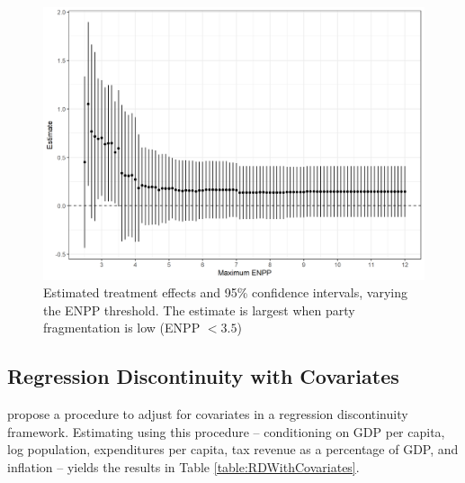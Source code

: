 \documentclass[12pt]{article}
\begin{document}
\begin{appendices}
	\begin{figure}[h]
		\centering
		\includegraphics[width=\linewidth]{figures/Figure8.png}
		\caption{Estimated treatment effects and 95\% confidence intervals, varying the ENPP threshold. The estimate is largest when party fragmentation is low (ENPP $< 3.5$)}
		\label{fig:rdEstimateVaryingENPP}
	\end{figure}

	\subsection{Regression Discontinuity with Covariates}
	
	\citet{Calonico2018} propose a procedure to adjust for covariates in a regression discontinuity framework. Estimating using this procedure -- conditioning on GDP per capita, log population, expenditures per capita, tax revenue as a percentage of GDP, and inflation -- yields the results in Table \ref{table:RDWithCovariates}. 
	

\end{appendices}
\end{document}
